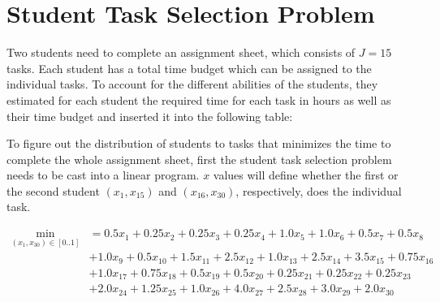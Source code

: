 \documentclass[12pt]{article}         %
\begin{document}
\section{Student Task Selection Problem}

Two students need to complete an assignment sheet, which consists of $J= 15$ tasks.  Each student has a total time budget which can be assigned to the individual tasks. To account for the different abilities of the students, they estimated for each student the required time for each task in hours as well as their time budget and inserted it into the following table:

\begin{table}[h]
\end{table}

To figure out the distribution of students to tasks that minimizes the time to complete the whole assignment sheet, first the student task selection problem needs to be cast into a linear program. $x$ values will define whether the first or the second student  $(x_1, x_{15})$ and $(x_{16}, x_{30})$, respectively, does the individual task.
 
 $$
 \begin{aligned}
 \min_{(x_1,x_{30})\in[0 .. 1]} &= 0.5x_1 + 0.25x_2 + 0.25x_3 + 0.25x_4 + 1.0x_5 + 1.0x_6+ 0.5x_7 + 0.5x_8\\&+ 1.0x_9 +0.5x_{10}+ 1.5x_{11}+ 2.5x_{12}+ 1.0x_{13}+ 2.5x_{14}+ 3.5x_{15}+
 0.75x_{16}\\ &+ 1.0x_{17}+  0.75x_{18}+ 0.5 x_{19}+ 0.5x_{20}+ 0.25x_{21}+ 0.25x_{22}+ 0.25x_{23}\\ &+2.0x_{24}+ 1.25x_{25}+1.0x_{26}+ 4.0x_{27}+ 2.5x_{28}+ 3.0 x_{29}+ 2.0x_{30}
 \end{aligned}
$$
\end{document}
